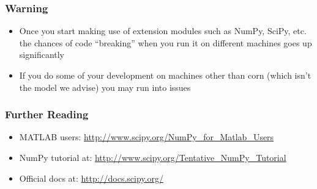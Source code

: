 \documentclass[12pt,letterpaper,twoside]{article}
\begin{document}
\hypertarget{warning}{%
\subsubsection{Warning}\label{warning}}

\begin{itemize}
\item
  Once you start making use of extension modules such as NumPy, SciPy,
  etc. the chances of code ``breaking'' when you run it on different
  machines goes up significantly
\item
  If you do some of your development on machines other than corn (which
  isn't the model we advise) you may run into issues
\end{itemize}

\hypertarget{further-reading}{%
\subsubsection{Further Reading}\label{further-reading}}

\begin{itemize}

\item
  MATLAB users: \url{http://www.scipy.org/NumPy_for_Matlab_Users}
\item
  NumPy tutorial at: \url{http://www.scipy.org/Tentative_NumPy_Tutorial}
\item
  Official docs at: \url{http://docs.scipy.org/}
\end{itemize}
\end{document}
